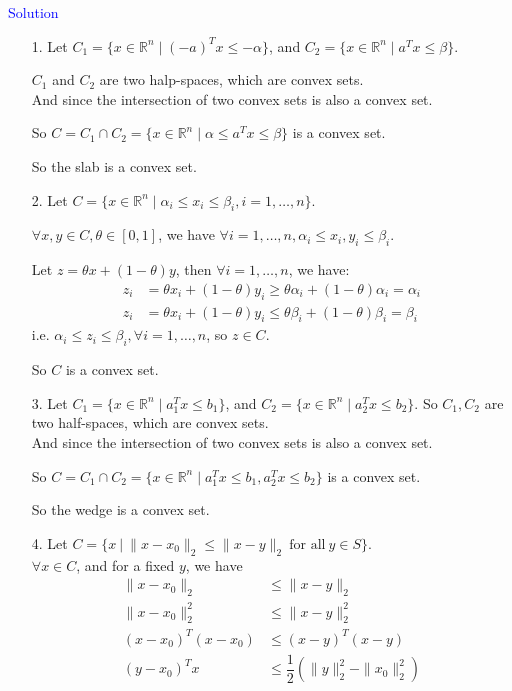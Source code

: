 \textcolor{blue}{Solution}
\begin{itemize}
\item[1.] Let $C_1=\{x \in \mathbb{R}^n \mid (-a)^T x \leq -\alpha\}$, and $C_2=\{x \in \mathbb{R}^n \mid a^T x \leq \beta\}$.

$C_1$ and $C_2$ are two halp-spaces, which are convex sets. \\
And since the intersection of two convex sets is also a convex set.

So $C=C_1\cap C_2=\{x \in \mathbb{R}^n \mid \alpha \leq a^T x \leq \beta\}$ is a convex set.

So the slab is a convex set.


\item[2.] Let $C=\{x \in \mathbb{R}^n \mid \alpha_i \leq x_i \leq \beta_i, i = 1, \dots, n\}$.

$\forall x,y\in C,\theta\in[0,1]$, we have $\forall i=1,\dots,n, \alpha_i\leq x_i,y_i\leq\beta_i$.

Let $z=\theta x+(1-\theta)y$, then $\forall i=1,\dots,n$, we have:
\begin{align*}
z_i &= \theta x_i + (1-\theta)y_i \geq \theta\alpha_i + (1-\theta)\alpha_i = \alpha_i \\
z_i &= \theta x_i + (1-\theta)y_i \leq \theta\beta_i + (1-\theta)\beta_i = \beta_i
\end{align*}
i.e. $\alpha_i \leq z_i \leq \beta_i, \forall i=1,\ldots,n$, so $z\in C$.

So $C$ is a convex set.


\item[3.] Let $C_1=\{x \in \mathbb{R}^n \mid a_1^T x \leq b_1\}$, and $C_2=\{x \in \mathbb{R}^n \mid a_2^T x \leq b_2\}$. So $C_1, C_2$ are two half-spaces, which are convex sets. \\
And since the intersection of two convex sets is also a convex set.

So $C=C_1\cap C_2=\{x \in \mathbb{R}^n \mid a_1^T x \leq b_1, a_2^T x \leq b_2\}$ is a convex set.

So the wedge is a convex set.


\item[4.] Let $C=\Big\{x~\vert~\|x-x_0\|_2\leq\|x-y\|_2~\text{for all}~y\in S\Big\}$.\\
$\forall x\in C$, and for a fixed $y$, we have
\begin{align*}
    \|x-x_0\|_2 &\leq \|x-y\|_2 \\
    \|x-x_0\|_2^2 &\leq \|x-y\|_2^2 \\
    (x-x_0)^T(x-x_0) &\leq (x-y)^T(x-y)\\
    (y-x_0)^Tx &\leq \dfrac{1}{2}\left(\|y\|_2^2-\|x_0\|_2^2\right)
\end{align*}


\end{itemize}
